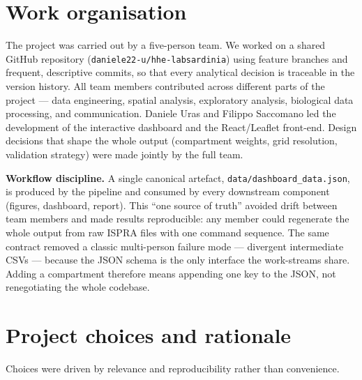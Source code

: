 \documentclass[11pt,a4paper]{article}
\begin{document}
\section{Work organisation}
The project was carried out by a five-person team. We worked on a shared GitHub repository
(\texttt{daniele22-u/hhe-labsardinia}) using feature branches and frequent, descriptive commits, so
that every analytical decision is traceable in the version history. All team members contributed
across different parts of the project --- data engineering, spatial analysis, exploratory analysis,
biological data processing, and communication. Daniele Uras and Filippo Saccomano led the
development of the interactive dashboard and the React/Leaflet front-end. Design decisions that
shape the whole output (compartment weights, grid resolution, validation strategy) were made
jointly by the full team.

\textbf{Workflow discipline.} A single canonical artefact, \texttt{data/dashboard\_data.json}, is
produced by the pipeline and consumed by every downstream component (figures, dashboard, report).
This ``one source of truth'' avoided drift between team members and made results reproducible: any
member could regenerate the whole output from raw ISPRA files with one command sequence. The same
contract removed a classic multi-person failure mode --- divergent intermediate CSVs --- because the
JSON schema is the only interface the work-streams share. Adding a compartment therefore means
appending one key to the JSON, not renegotiating the whole codebase.

\section{Project choices and rationale}
Choices were driven by relevance and reproducibility rather than convenience.
\end{document}
